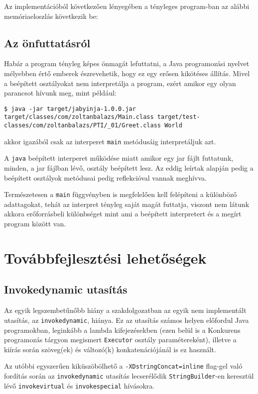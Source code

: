 Az implementációból következően lényegében a tényleges program-ban az alábbi memóriaeloszlás következik be:

\subsection{Az önfuttatásról}

Habár a program tényleg képes önmagát lefuttatni, a Java programozási nyelvet mélyebben értő emberek észrevehetik, hogy ez egy erősen kikötéses állítás. Mivel a beépített osztályokat nem interpretálja a program, ezért amikor egy olyan parancsot hívunk meg, mint például: 
\begin{verbatim}
$ java -jar target/jabyinja-1.0.0.jar target/classes/com/zoltanbalazs/Main.class target/test-classes/com/zoltanbalazs/PTI/_01/Greet.class World
\end{verbatim}
akkor igazából csak az interperet \lstinline{main} metódusáig interpretáljuk azt.

A \lstinline{java} beépített interperet működése miatt amikor egy jar fájlt futtatunk, minden, a jar fájlban lévő, osztály beépített lesz. Az eddig leírtak alapján pedig a beépített osztályok metódusai pedig reflekcióval vannak meghívva.

Természetesen a \lstinline{main} függvényben is megfelelően kell felépíteni a különböző adattagokat, tehát az interpret tényleg saját magát futtatja, viszont nem látunk akkora erőforrásbeli különbséget mint ami a beépített interpretert és a megírt program között van.

\section{Továbbfejlesztési lehetőségek}

\subsection{Invokedynamic utasítás}

Az egyik legszembetűnőbb hiány a szakdolgozatban az egyik nem implementált utasítás, az \lstinline{invokedynamic}, hiánya.
Ez az utasítás számos helyen előfordul Java programokban, leginkább a lambda kifejezésekben (ezen belül is a Konkurens programozás tárgyon megismert \lstinline{Executor} osztály paramétereként), illetve a kiírás során szöveg(ek) és változó(k) konkatenációjánál is ez használt.

Az utóbbi egyszerűen kiküszöbölhető a \lstinline{-XDstringConcat=inline} flag-gel való fordítás során az \lstinline{invokedynamic} utasítás lecserélődik \lstinline{StringBuilder}-en keresztül lévő \lstinline{invokevirtual} és \lstinline{invokespecial} hívásokra.

